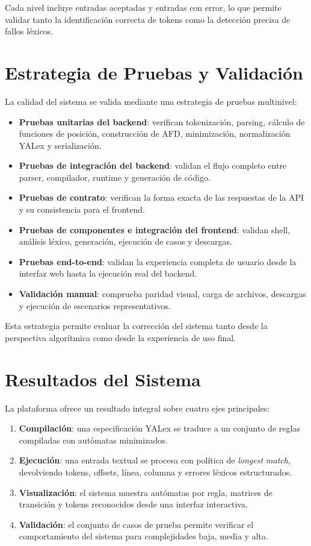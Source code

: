 \documentclass[12pt,a4paper]{article}
\begin{document}
Cada nivel incluye entradas aceptadas y entradas con error, lo que permite validar tanto la identificación correcta de tokens como la detección precisa de fallos léxicos.

\section{Estrategia de Pruebas y Validación}

La calidad del sistema se valida mediante una estrategia de pruebas multinivel:

\begin{itemize}[leftmargin=2em]
  \item \textbf{Pruebas unitarias del backend}: verifican tokenización, parsing, cálculo de funciones de posición, construcción de AFD, minimización, normalización YALex y serialización.
  \item \textbf{Pruebas de integración del backend}: validan el flujo completo entre parser, compilador, runtime y generación de código.
  \item \textbf{Pruebas de contrato}: verifican la forma exacta de las respuestas de la API y su consistencia para el frontend.
  \item \textbf{Pruebas de componentes e integración del frontend}: validan shell, análisis léxico, generación, ejecución de casos y descargas.
  \item \textbf{Pruebas end-to-end}: validan la experiencia completa de usuario desde la interfaz web hasta la ejecución real del backend.
  \item \textbf{Validación manual}: comprueba paridad visual, carga de archivos, descargas y ejecución de escenarios representativos.
\end{itemize}

Esta estrategia permite evaluar la corrección del sistema tanto desde la perspectiva algorítmica como desde la experiencia de uso final.

\section{Resultados del Sistema}

La plataforma ofrece un resultado integral sobre cuatro ejes principales:

\begin{enumerate}[leftmargin=2em]
  \item \textbf{Compilación}: una especificación YALex se traduce a un conjunto de reglas compiladas con autómatas minimizados.
  \item \textbf{Ejecución}: una entrada textual se procesa con política de \emph{longest match}, devolviendo tokens, offsets, línea, columna y errores léxicos estructurados.
  \item \textbf{Visualización}: el sistema muestra autómatas por regla, matrices de transición y tokens reconocidos desde una interfaz interactiva.
  \item \textbf{Validación}: el conjunto de casos de prueba permite verificar el comportamiento del sistema para complejidades baja, media y alta.
\end{enumerate}
\end{document}
